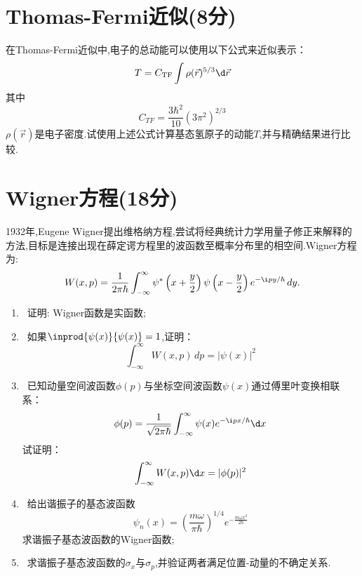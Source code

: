 \documentclass{ctexart}
\begin{document}
\section{Thomas-Fermi近似(8分)}
在Thomas-Fermi近似中,电子的总动能可以使用以下公式来近似表示：
\[T = C_{\text{TF}} \int \rho(\vec{r})^{5/3} 
\d\vec{r}\]其中
\[
C_{TF} = \frac{3\hbar^2}{10}(3\pi^2)^{2/3}
\]
$\rho(\vec{r})$是电子密度.试使用上述公式计算基态氢原子的动能$T$,并与精确结果进行比较.
\section{Wigner方程(18分)}
1932年,Eugene Wigner提出维格纳方程,尝试将经典统计力学用量子修正来解释的方法,目标是连接出现在薛定谔方程里的波函数至概率分布里的相空间.Wigner方程为:
\[
W(x, p) = \frac{1}{2\pi\hbar} \int_{-\infty}^{\infty} \psi^*\left(x + \frac{y}{2}\right) \psi\left(x - \frac{y}{2}\right) e^{-\i p y / \hbar} \, dy.
\]

\begin{enumerate}[label=\tbf{\arabic*.}]
    \item {}\ 证明: Wigner函数是实函数;
    \item {}\ 如果$\inprod{\psi(x)}{\psi(x)}=1$,证明：
    \[\int_{-\infty}^{\infty} W(x, p) \, dp = |\psi(x)|^2\]
    \item {}\ 已知动量空间波函数$\phi(p)$与坐标空间波函数$\psi(x)$通过傅里叶变换相联系：
    \[\phi(p) = \frac{1}{\sqrt{2\pi\hbar}} \int_{-\infty}^{\infty} \psi(x) e^{-\i p x/\hbar} \d x\]
    试证明：
    \[\int_{-\infty}^{\infty} W(x, p)\d x =|\phi(p)|^2\]
    \item {}\ 给出谐振子的基态波函数
    \[\psi_n(x) = \left( \frac{m\omega}{\pi\hbar} \right)^{1/4} e^{-\frac{m\omega x^2}{2\hbar}}\]
    求谐振子基态波函数的Wigner函数;
    \item {}\ 求谐振子基态波函数的$\sigma_x$与$\sigma_p$,并验证两者满足位置-动量的不确定关系.
\end{enumerate}
\end{document}
